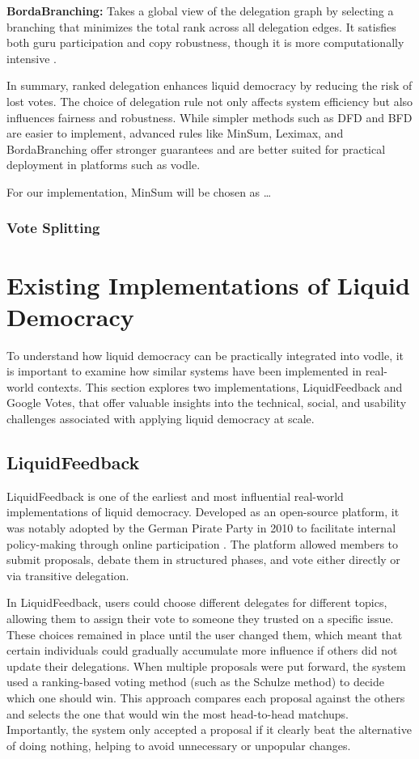 \textbf{BordaBranching:} Takes a global view of the delegation graph by selecting a branching that minimizes the total rank across all delegation edges. It satisfies both guru participation and copy robustness, though it is more computationally intensive \citep{brill_liquid_2022}.

In summary, ranked delegation enhances liquid democracy by reducing the risk of lost votes. The choice of delegation rule not only affects system efficiency but also influences fairness and robustness. While simpler methods such as DFD and BFD are easier to implement, advanced rules like MinSum, Leximax, and BordaBranching offer stronger guarantees and are better suited for practical deployment in platforms such as vodle.

For our implementation, MinSum will be chosen as \dots

\subsubsection{Vote Splitting}



\section{Existing Implementations of Liquid Democracy}
To understand how liquid democracy can be practically integrated into vodle, it is important to examine how similar systems have been implemented in real-world contexts. 
This section explores two implementations, LiquidFeedback and Google Votes, that offer valuable insights into the technical, social, and usability challenges associated with applying liquid democracy at scale.
\subsection{LiquidFeedback}
LiquidFeedback is one of the earliest and most influential real-world implementations of liquid democracy. Developed as an open-source platform, it was notably adopted by the German Pirate Party in 2010 to facilitate internal policy-making through online participation \citep{behrens_liquidfeedback_2014}. The platform allowed members to submit proposals, debate them in structured phases, and vote either directly or via transitive delegation.

In LiquidFeedback, users could choose different delegates for different topics, allowing them to assign their vote to someone they trusted on a specific issue. These choices remained in place until the user changed them, which meant that certain individuals could gradually accumulate more influence if others did not update their delegations. When multiple proposals were put forward, the system used a ranking-based voting method (such as the Schulze method) to decide which one should win. This approach compares each proposal against the others and selects the one that would win the most head-to-head matchups. Importantly, the system only accepted a proposal if it clearly beat the alternative of doing nothing, helping to avoid unnecessary or unpopular changes.

